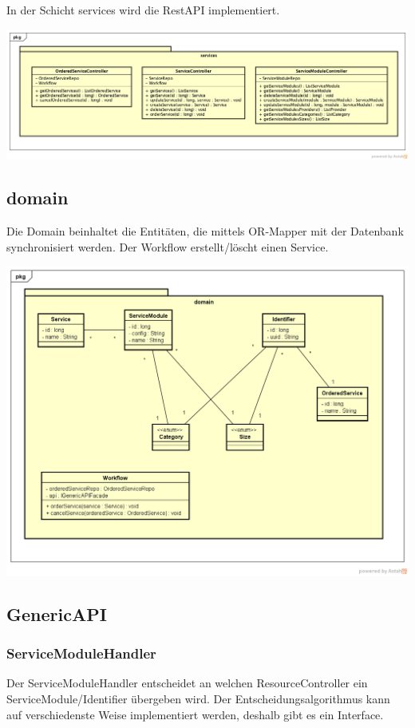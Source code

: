In der Schicht services wird die RestAPI implementiert.

\begin{center}
\includegraphics[width=\textwidth]{./05_Design/04_Architektur/services}
\end{center}

\subsection{domain}

Die Domain beinhaltet die Entitäten, die mittels OR-Mapper mit der Datenbank synchronisiert werden.
Der Workflow erstellt/löscht einen Service.

\begin{center}
\includegraphics[width=\textwidth]{./05_Design/04_Architektur/domain}
\end{center}

\subsection{GenericAPI}
\subsubsection{ServiceModuleHandler}
Der ServiceModuleHandler entscheidet an welchen ResourceController ein ServiceModule/Identifier übergeben wird.
Der Entscheidungsalgorithmus kann auf verschiedenste Weise implementiert werden, deshalb gibt es ein Interface.

